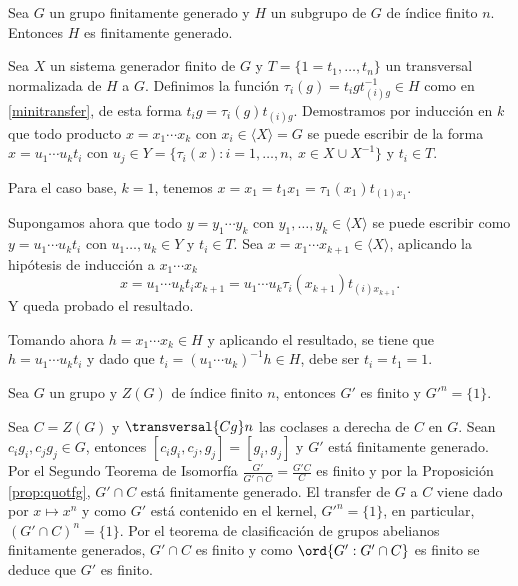 \begin{lema}[Schreier]\label{prop:quotfg} %
	Sea $G$ un grupo finitamente generado y $H$ un subgrupo de $G$ de índice finito $n$. Entonces $H$ es finitamente generado.
	\begin{demostracion}
		Sea $X$ un sistema generador finito de $G$ y $T=\{1=t_1,\ldots,t_n\}$ un transversal normalizada de $H$ a $G$. Definimos la función $\tau_{i}(g) = t_igt_{(i)g}^{-1}\in H$ como en \eqref{minitransfer}, de esta forma $t_i g = \tau_{i}(g)t_{(i)g}$.
		Demostramos por inducción en $k$ que todo producto $x=x_1\cdots x_k$ con $x_i \in \langle X \rangle = G$ se puede escribir de la forma $x=u_1\cdots u_k t_i$ con $u_j\in Y=\{\tau_i(x) : i=1,\ldots,n,\ x\in X\cup X^{-1}\}$ y $t_i\in T$. 
		
		Para el caso base, $k=1$, tenemos $x=x_1=t_1x_1 = \tau_1(x_1)t_{(1)x_1}$.
		
		Supongamos ahora que todo $y=y_1\cdots y_k$ con $y_1,\ldots, y_k\in \langle X \rangle$ se puede escribir como $y=u_1\cdots u_k t_i$ con $u_1\ldots, u_k \in Y$ y $t_i\in T$.
		 Sea $x=x_1\cdots x_{k+1}\in \langle X \rangle$, aplicando la hipótesis de inducción a $x_1\cdots x_k$
		\begin{equation*}
			x=u_1\cdots u_k t_i x_{k+1} = u_1\cdots u_k \tau_i(x_{k+1}) t_{(i)x_{k+1}}.
		\end{equation*}
		Y queda probado el resultado.
		
		Tomando ahora $h=x_1\cdots x_k \in H$ y aplicando el resultado, se tiene que $h=u_1\cdots u_k t_i$ y dado que $t_i = (u_1\cdots u_k)^{-1} h\in H$, debe ser $t_i=t_1=1$.
		
		
		
	
	\end{demostracion}
\end{lema}

\begin{teorema}[Schur]
	Sea $G$ un grupo y $Z(G)$ de índice finito $n$, entonces $G'$ es finito y $G'^n = \{1\}$.
	\begin{demostracion}
		Sea $C=Z(G)$ y $\transversal {Cg} n$ las coclases a derecha de $C$ en $G$. Sean $c_ig_i,c_jg_j\in G$, entonces $[c_ig_i,c_j,g_j] = [g_i,g_j]$ y $G'$ está finitamente generado. Por el Segundo Teorema de Isomorfía $\frac{G'}{G'\cap C} = \frac{G'C}{C}$ es finito y por la Proposición \ref{prop:quotfg}, $G'\cap C$ está finitamente generado.
		El transfer de $G$ a $C$ viene dado por $x\mapsto x^n$ y como $G'$ está contenido en el kernel, $G'^n = \{1\}$, en particular, $(G'\cap C)^n = \{1\}$. Por el teorema de clasificación de grupos abelianos finitamente generados, $G'\cap C$ es finito y como $\ord{G':G'\cap C}$ es finito se deduce que $G'$ es finito.
	\end{demostracion}
\end{teorema}


